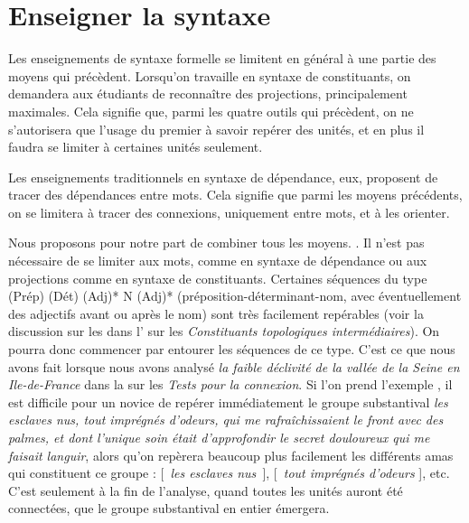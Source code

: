 \section{Enseigner la syntaxe}\label{sec:3.4.28}

Les enseignements de syntaxe formelle se limitent en général à une partie des moyens qui précèdent. Lorsqu’on travaille en syntaxe de constituants, on demandera aux étudiants de reconnaître des projections, principalement maximales. Cela signifie que, parmi les quatre outils qui précèdent, on ne s’autorisera que l’usage du premier à savoir repérer des unités, et en plus il faudra se limiter à certaines unités seulement.

Les enseignements traditionnels en syntaxe de dépendance, eux, proposent de tracer des dépendances entre mots. Cela signifie que parmi les moyens précédents, on se limitera à tracer des connexions, uniquement entre mots, et à les orienter.

Nous proposons pour notre part de combiner tous les moyens. . Il n’est pas nécessaire de se limiter aux mots, comme en syntaxe de dépendance ou aux projections comme en syntaxe de constituants. Certaines séquences du type (Prép) (Dét) (Adj)* N (Adj)* (pré\-po\-si\-tion-dé\-ter\-mi\-nant-nom, avec éventuellement des adjectifs avant ou après le nom) sont très facilement repérables (voir la discussion sur les  dans l' sur les \textit{Constituants topologiques intermédiaires}). On pourra donc commencer par entourer les séquences de ce type. C’est ce que nous avons fait lorsque nous avons analysé \textit{la faible déclivité de la vallée de la Seine en Ile-de-France} dans la  sur les \textit{Tests pour la connexion}. Si l’on prend l'exemple , il est difficile pour un novice de repérer immédiatement le groupe substantival \textit{les esclaves nus, tout imprégnés d’odeurs, qui me rafraîchissaient le front avec des palmes, et dont l’unique soin était d’approfondir le secret douloureux qui me faisait languir}, alors qu’on repèrera beaucoup plus facilement les différents amas qui constituent ce groupe : [~\textit{les esclaves nus~}], [~\textit{tout imprégnés d’odeurs} ], etc. C’est seulement à la fin de l’analyse, quand toutes les unités auront été connectées, que le groupe substantival en entier émergera.

